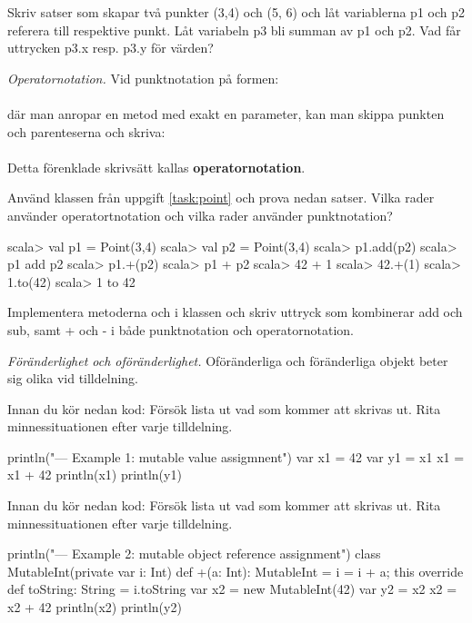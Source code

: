 \Subtask Skriv satser som skapar två punkter (3,4) och (5, 6) och låt variablerna p1 och p2 referera till respektive punkt. Låt variabeln p3 bli summan av p1 och p2. Vad får uttrycken p3.x resp. p3.y för värden?

\Task \emph{Operatornotation.} Vid punktnotation på formen: \\  \\ där man anropar en metod med exakt en parameter, kan man skippa punkten och parenteserna och skriva:\\   \\
Detta förenklade skrivsätt kallas \textbf{operatornotation}.

\Subtask Använd klassen  från uppgift \ref{task:point} och prova nedan satser. Vilka rader använder operatortnotation och vilka rader använder punktnotation?
\begin{REPL}
scala> val p1 = Point(3,4)
scala> val p2 = Point(3,4)
scala> p1.add(p2)
scala> p1 add p2
scala> p1.+(p2)
scala> p1 + p2
scala> 42 + 1
scala> 42.+(1)
scala> 1.to(42)
scala> 1 to 42
\end{REPL}

\Subtask Implementera metoderna  och \code{-} i klassen  och skriv uttryck som kombinerar add och sub, samt + och - i både punktnotation och operatornotation.



\Task \emph{Föränderlighet och oföränderlighet.} Oföränderliga och föränderliga objekt beter sig olika vid tilldelning.  

\Subtask\Pen Innan du kör nedan kod: Försök lista ut vad som kommer att skrivas ut. Rita minnessituationen efter varje tilldelning. 

\begin{Code}
println("\n--- Example 1: mutable value assigmnent")
var x1 = 42
var y1 = x1
x1 = x1 + 42
println(x1)
println(y1)
\end{Code}

\Subtask\Pen Innan du kör nedan kod: Försök lista ut vad som kommer att skrivas ut. Rita minnessituationen efter varje tilldelning.

\begin{Code}
println("\n--- Example 2: mutable object reference assignment")
class MutableInt(private var i: Int) {
  def +(a: Int): MutableInt = { i = i + a; this }
  override def toString: String = i.toString
}
var x2 = new MutableInt(42)
var y2 = x2
x2 = x2 + 42
println(x2)
println(y2)
\end{Code}

